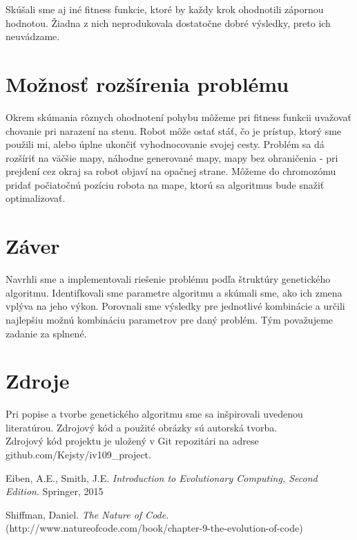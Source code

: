 \documentclass[10pt]{paper}
\begin{document}
Skúšali sme aj iné fitness funkcie, ktoré by každy krok ohodnotili zápornou hodnotou. Žiadna z nich neprodukovala dostatočne dobré výsledky, preto ich neuvádzame.

\section{Možnosť rozšírenia problému}

Okrem skúmania rôznych ohodnotení pohybu môžeme pri fitness funkcii uvažovať chovanie pri narazení na stenu. Robot môže ostať stáť, čo je prístup, ktorý sme použili mi, alebo úplne ukončiť vyhodnocovanie svojej cesty. Problém sa dá rozšíriť na väčšie mapy, náhodne generované mapy, mapy bez ohraničenia - pri prejdení cez okraj sa robot objaví na opačnej strane. Môžeme do chromozómu pridať počiatočnú pozíciu robota na mape, ktorú sa algoritmus bude snažiť optimalizovať.

\section{Záver}

Navrhli sme a implementovali riešenie problému podľa štruktúry genetického algoritmu. Identifkovali sme parametre algoritmu a skúmali sme, ako ich zmena vplýva na jeho výkon. Porovnali sme výsledky pre jednotlivé kombinácie a určili najlepšiu možnú kombináciu parametrov pre daný problém. Tým považujeme zadanie za splnené.
\section{Zdroje}

Pri popise a tvorbe genetického algoritmu sme sa inšpirovali uvedenou literatúrou. Zdrojový kód a použité obrázky sú autorská tvorba.\\



Zdrojový kód projektu je uložený v Git repozitári na adrese github.com/Kejsty/iv109{\_}project.


\begin{thebibliography}{9}
	Eiben, A.E., Smith, J.E. 
	\textit{Introduction to Evolutionary Computing, Second Edition}. 
	Springer, 2015
	
	Shiffman, Daniel.
	\textit{The Nature of Code}. 
	\\(http://www.natureofcode.com/book/chapter-9-the-evolution-of-code)
	
\end{thebibliography}
\end{document}
